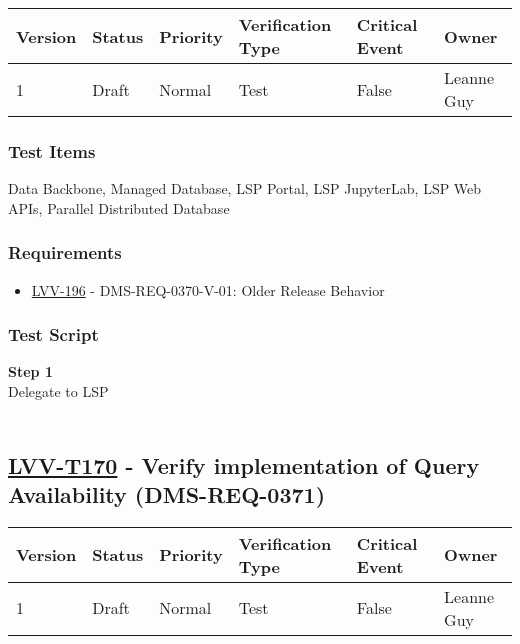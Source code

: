 \begin{longtable}[]{@{}llllll@{}}
\toprule
Version & Status & Priority & Verification Type & Critical Event &
Owner\tabularnewline
\midrule
\endhead
1 & Draft & Normal & Test & False & Leanne Guy\tabularnewline
\bottomrule
\end{longtable}

\hypertarget{test-items-145}{%
\subsubsection{Test Items}\label{test-items-145}}

Data Backbone, Managed Database, LSP Portal, LSP JupyterLab, LSP Web
APIs, Parallel Distributed Database~

\hypertarget{requirements-146}{%
\subsubsection{Requirements}\label{requirements-146}}

\begin{itemize}
\tightlist
\item
  \href{https://jira.lsstcorp.org/browse/LVV-196}{LVV-196} -
  DMS-REQ-0370-V-01: Older Release Behavior
\end{itemize}

\hypertarget{test-script-146}{%
\subsubsection{Test Script}\label{test-script-146}}

\textbf{Step 1}\\
Delegate to LSP\\
~\\

\hypertarget{lvv-t170---verify-implementation-of-query-availability-dms-req-0371}{%
\subsection{\texorpdfstring{\href{https://jira.lsstcorp.org/secure/Tests.jspa\#/testCase/LVV-T170}{LVV-T170}
- Verify implementation of Query Availability
(DMS-REQ-0371)}{LVV-T170 - Verify implementation of Query Availability (DMS-REQ-0371)}}\label{lvv-t170---verify-implementation-of-query-availability-dms-req-0371}}

\begin{longtable}[]{@{}llllll@{}}
\toprule
Version & Status & Priority & Verification Type & Critical Event &
Owner\tabularnewline
\midrule
\endhead
1 & Draft & Normal & Test & False & Leanne Guy\tabularnewline
\bottomrule
\end{longtable}

